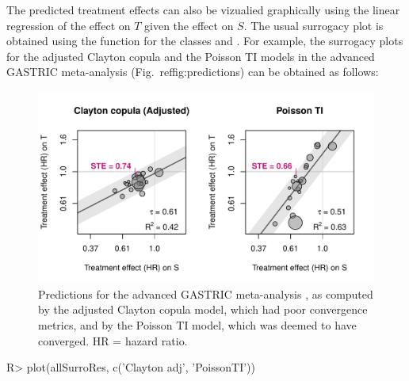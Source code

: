 \documentclass[article,shortnames, nojss]{jss}\usepackage[]{graphicx}\usepackage[]{color}
\begin{document}
The predicted treatment effects can also be vizualied graphically
  using the linear regression of the effect on $T$ given the effect on $S$.
The usual surrogacy plot is obtained using the function 
  for the classes  and .
For example, the surrogacy plots
  for the adjusted Clayton copula and the Poisson TI models
  in the advanced GASTRIC meta-analysis (Fig.~ref{fig:predictions})
  can be obtained as follows:
\begin{Schunk}
\begin{figure}
\includegraphics[width=\textwidth]{./predictions-1} \caption[Predictions for the advanced GASTRIC meta-analysis \citep{GASTRIC13}, as computed by the adjusted Clayton copula model, which had poor convergence metrics, and by the Poisson TI model, which was deemed to have converged]{Predictions for the advanced GASTRIC meta-analysis \citep{GASTRIC13}, as computed by the adjusted Clayton copula model, which had poor convergence metrics, and by the Poisson TI model, which was deemed to have converged. HR = hazard ratio.}\label{fig:predictions}
\end{figure}
\end{Schunk}
\begin{Schunk}
\begin{Sinput}
R>   plot(allSurroRes, c('Clayton adj', 'PoissonTI'))
\end{Sinput}
\end{Schunk}
\end{document}
